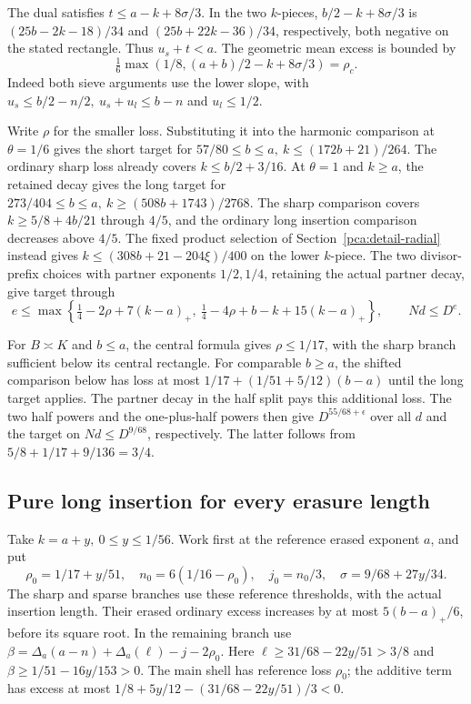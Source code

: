 The dual satisfies \(t\le a-k+8\sigma/3\).
In the two \(k\)-pieces, \(b/2-k+8\sigma/3\) is
\((25b-2k-18)/34\) and \((25b+22k-36)/34\), respectively,
both negative on the stated rectangle. Thus \(u_s+t<a\).
The geometric mean excess is bounded by
\[
 \tfrac16\max(1/8,(a+b)/2-k+8\sigma/3)=\rho_c .
\]
Indeed both sieve arguments use the lower slope, with
\(u_s\le b/2-n/2,\ u_s+u_l\le b-n\) and \(u_l\le1/2\).

Write \(\rho\) for the smaller loss. Substituting it into the
harmonic comparison at \(\theta=1/6\) gives the short target
for \(57/80\le b\le a,\ k\le(172b+21)/264\).
The ordinary sharp loss already covers \(k\le b/2+3/16\).
At \(\theta=1\) and \(k\ge a\), the retained decay gives
the long target for \(273/404\le b\le a,\
k\ge(508b+1743)/2768\).
The sharp comparison covers \(k\ge5/8+4b/21\) through \(4/5\),
and the ordinary long insertion comparison decreases above \(4/5\).
The fixed product selection of Section~\ref{pca:detail-radial}
instead gives \(k\le(308b+21-204\xi)/400\) on the lower
\(k\)-piece. The two divisor-prefix choices with partner
exponents \(1/2,1/4\), retaining the actual partner decay,
give target through
\[
 e\le\max\left\{
 \tfrac14-2\rho+7(k-a)_+,\ 
 \tfrac14-4\rho+b-k+15(k-a)_+
 \right\},\qquad Nd\le D^e .
\]

For \(B\asymp K\) and \(b\le a\), the central formula gives
\(\rho\le1/17\), with the sharp branch sufficient below its
central rectangle. For comparable \(b\ge a\), the shifted
comparison below has loss at most
\(1/17+(1/51+5/12)(b-a)\) until the long target applies.
The partner decay in the half split pays this additional
loss. The two half powers and the one-plus-half powers then
give \(D^{55/68+\epsilon}\) over all \(d\) and the target
on \(Nd\le D^{9/68}\), respectively. The latter follows from
\(5/8+1/17+9/136=3/4\).

\subsection{Pure long insertion for every erasure length}
\label{pca:detail-long}

Take \(k=a+y,\ 0\le y\le1/56\). Work first at the reference
erased exponent \(a\), and put
\[
 \rho_0=1/17+y/51,\quad n_0=6(1/16-\rho_0),\quad
 j_0=n_0/3,\quad \sigma=9/68+27y/34 .
\]
The sharp and sparse branches use these reference thresholds,
with the actual insertion length. Their erased ordinary excess
increases by at most \(5(b-a)_+/6\), before its square root.
In the remaining branch use
\(\beta=\Delta_a(a-n)+\Delta_a(\ell)-j-2\rho_0\).
Here \(\ell\ge31/68-22y/51>3/8\) and
\(\beta\ge1/51-16y/153>0\).
The main shell has reference loss \(\rho_0\);
the additive term has excess at most
\(1/8+5y/12-(31/68-22y/51)/3<0\).

